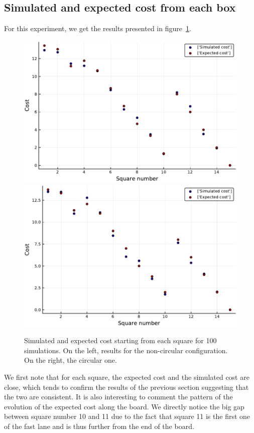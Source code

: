 \subsection{Simulated and expected cost from each box}
For this experiment, we get the results presented in figure~\ref{fig:cost_per_square_100_iter}.

\begin{figure}[H]
\centering
\includegraphics[scale=0.553]{../img/board_unif_low/cost_per_square_100_iter_noncirc.pdf}
\includegraphics[scale=0.553]{../img/board_unif_low/cost_per_square_100_iter_circ.pdf}
\caption{Simulated and expected cost starting from each square for 100 simulations. On the left, results for the non-circular configuration. On the right, the circular one.}
\label{fig:cost_per_square_100_iter}
\end{figure}

We first note that for each square, the expected cost and the simulated cost are close, which tends to confirm the results of the previous section suggesting that the two are consistent. 
It is also interesting to comment the pattern of the evolution of the expected cost along the board. 
We directly notice the big gap between square number 10 and 11 due to the fact that square 11 is the first one of the fast lane and is thus further from the end of the board.

